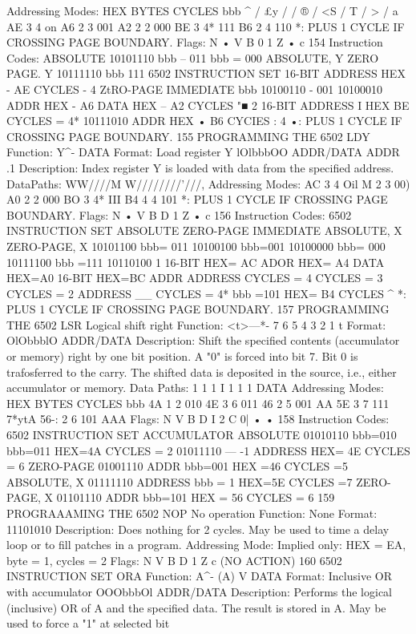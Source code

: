 Addressing Modes:
HEX
BYTES
CYCLES
bbb
^ / £y / / ® / <S / T / > / a
AE
3
4
on
A6
2
3
001
A2
2
2
000
BE
3
4*
111
B6
2
4
110
*: PLUS 1 CYCLE IF CROSSING PAGE BOUNDARY.
Flags:
N
•
V B 0 1 Z
•
c
154
Instruction Codes:
ABSOLUTE 10101110
bbb -- 011
bbb = 000
ABSOLUTE, Y
ZERO PAGE. Y
10111110
bbb 111
6502 INSTRUCTION SET
16-BIT ADDRESS
HEX - AE CYCLES - 4
ZtRO-PAGE
IMMEDIATE
bbb
10100110
- 001
10100010
ADDR
HEX - A6
DATA
HEX -- A2 CYCLES "■ 2
16-BIT ADDRESS
I
HEX BE CYCLES = 4*
10111010 ADDR
HEX • B6 CYCIES : 4
•: PLUS 1 CYCLE IF CROSSING PAGE BOUNDARY.
155
PROGRAMMING THE 6502
LDY
Function:
Y^- DATA
Format:
Load register Y
lOlbbbOO ADDR/DATA ADDR
.1
Description:
Index register Y is loaded with data from the specified address.
DataPaths:
WW////M W////////'///,
Addressing Modes:
AC
3
4
Oil
M
2
3
00)
A0
2
2
000
BO
3
4*
III
B4
4
4
101
*: PLUS 1 CYCLE IF CROSSING PAGE BOUNDARY.
Flags:
N
•
V B D 1 Z
•
c
156
Instruction Codes:
6502 INSTRUCTION SET
ABSOLUTE
ZERO-PAGE
IMMEDIATE
ABSOLUTE, X
ZERO-PAGE, X
10101100
bbb= 011
10100100
bbb=001
10100000
bbb= 000
10111100
bbb =111
10110100
1
16-BIT
HEX= AC
ADOR
HEX= A4
DATA
HEX=A0
16-BIT
HEX=BC
ADDR
ADDRESS
CYCLES = 4
CYCLES = 3
CYCLES = 2
ADDRESS
__
CYCLES = 4*
bbb =101 HEX= B4 CYCLES ^
*: PLUS 1 CYCLE IF CROSSING PAGE BOUNDARY.
157
PROGRAMMING THE 6502
LSR Logical shift right
Function: <t>—*- 7 6 5 4 3 2 1 t
Format: OlObbblO ADDR/DATA
Description:
Shift the specified contents (accumulator or memory) right by
one bit position. A "0" is forced into bit 7. Bit 0 is trafosferred to
the carry. The shifted data is deposited in the source, i.e., either
accumulator or memory.
Data Paths:
1
1
1
I
1
1
1
DATA
Addressing Modes:
HEX
BYTES
CYCLES
bbb
4A
1
2
010
4E
3
6
011
46
2
5
001
AA
5E
3
7
111
7*ytA
56-:
2
6
101
AAA
Flags:
N V B D I 2 C
0| • •
158
Instruction Codes:
6502 INSTRUCTION SET
ACCUMULATOR
ABSOLUTE
01010110
bbb=010
bbb=011
HEX=4A CYCLES = 2
01011110
— -1
ADDRESS
HEX= 4E CYCLES = 6
ZERO-PAGE 01001110 ADDR
bbb=001 HEX =46 CYCLES =5
ABSOLUTE, X 01111110 ADDRESS
bbb = 1 HEX=5E CYCLES =7
ZERO-PAGE, X 01101110 ADDR
bbb=101 HEX = 56 CYCLES = 6
159
PROGRAAAMING THE 6502
NOP No operation
Function:
None
Format: 11101010
Description:
Does nothing for 2 cycles. May be used to time a delay loop or to
fill patches in a program.
Addressing Mode:
Implied only:
HEX = EA, byte = 1, cycles = 2
Flags:
N V B D 1 Z c
(NO ACTION)
160
6502 INSTRUCTION SET
ORA
Function:
A^- (A) V DATA
Format:
Inclusive OR with accumulator
OOObbbOl ADDR/DATA
Description:
Performs the logical (inclusive) OR of A and the specified data.
The result is stored in A. May be used to force a "1" at selected bit
